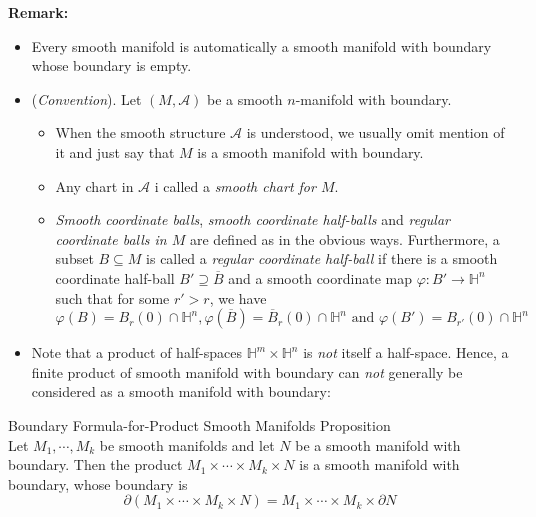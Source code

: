 \noindent\textbf{Remark:} \begin{itemize}
    \item Every smooth manifold is automatically a smooth manifold with boundary whose boundary is empty.
    \item (\textit{Convention}). Let $(M,\mathcal{A})$ be a smooth $n$-manifold with boundary.
    \begin{itemize}
        \item When the smooth structure $\mathcal{A}$ is understood, we usually omit mention of it and just say that $M$ is a smooth manifold with boundary.
        \item Any chart in $\mathcal{A}$ i called a \textit{smooth chart for $M$}.
        \item \textit{Smooth coordinate balls}, \textit{smooth coordinate half-balls} and \textit{regular coordinate balls in $M$} are defined as in the obvious ways. Furthermore, a subset $B\subseteq M$ is called a \textit{regular coordinate half-ball} if there is a smooth coordinate half-ball $B' \supseteq \overline{B}$ and a smooth coordinate map $\varphi:B' \to \mathbb{H}^n$ such that for some $r'>r$, we have
        \[
        \varphi(B)= B_r(0) \cap \mathbb{H}^n ,\varphi(\overline{B})= \overline{B}_r(0) \cap \mathbb{H}^n \text{ and } \varphi(B')= B_{r'} (0) \cap \mathbb{H}^n
        \]
    \end{itemize}

    \item Note that a product of half-spaces $\mathbb{H}^m \times \mathbb{H}^n$ is \textit{not} itself a half-space. Hence, a finite product of smooth manifold with boundary can \textit{not} generally be considered as a smooth manifold with boundary:
\end{itemize}

\begin{proposition}{Boundary Formula-for-Product Smooth Manifolds Proposition}\\
Let $M_1 ,\cdots ,M_k$ be smooth manifolds and let $N$ be a smooth manifold with boundary. Then the product $M_1 \times \cdots \times M_k\times N$ is a smooth manifold with boundary, whose boundary is
\[
\partial (M_1 \times \cdots \times M_k\times N) = M_1 \times \cdots \times M_k\times \partial N
\]
\end{proposition}

